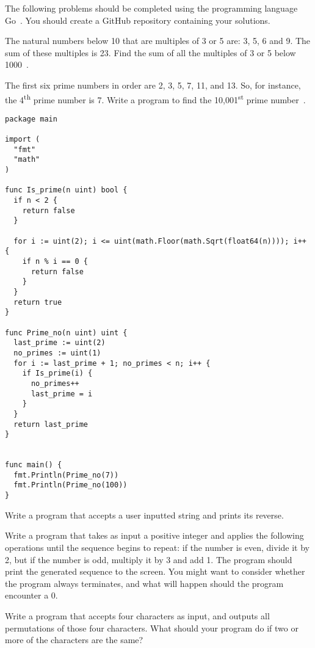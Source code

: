 

\noindent
The following problems should be completed using the programming language Go~\cite{gowebsite}.
You should create a GitHub repository containing your solutions.


\begin{questions}


\question
The natural numbers below 10 that are multiples of 3 or 5 are: 3, 5, 6 and 9.
The sum of these multiples is 23.
Find the sum of all the multiples of 3 or 5 below 1000~\cite{projecteuler}.
\begin{solution}
\end{solution}


\question
The first six prime numbers in order are 2, 3, 5, 7, 11, and 13.
So, for instance, the 4\textsuperscript{th} prime number is 7.
Write a program to find the 10,001\textsuperscript{st} prime number~\cite{projecteuler}.
\begin{solution}
\begin{verbatim}
package main

import (
  "fmt"
  "math"
)

func Is_prime(n uint) bool {
  if n < 2 {
    return false
  }
  
  for i := uint(2); i <= uint(math.Floor(math.Sqrt(float64(n)))); i++ {
    if n % i == 0 {
      return false
    }
  }
  return true
}

func Prime_no(n uint) uint {
  last_prime := uint(2)
  no_primes := uint(1)
  for i := last_prime + 1; no_primes < n; i++ {
    if Is_prime(i) {
      no_primes++
      last_prime = i
    }
  }
  return last_prime
}


func main() {
  fmt.Println(Prime_no(7))
  fmt.Println(Prime_no(100))
}
\end{verbatim}
\end{solution}


\question
Write a program that accepts a user inputted string and prints its reverse.
\begin{solution}
\end{solution}


\question
Write a program that takes as input a positive integer and applies the following operations until the sequence begins to repeat: if the number is even, divide it by 2, but if the number is odd, multiply it by 3 and add 1.
The program should print the generated sequence to the screen.
You might want to consider whether the program always terminates, and what will happen should the program encounter a 0. 
\begin{solution}
\end{solution}


\question
Write a program that accepts four characters as input, and outputs all permutations of those four characters.
What should your program do if two or more of the characters are the same?
\begin{solution}
\end{solution}


\end{questions}
